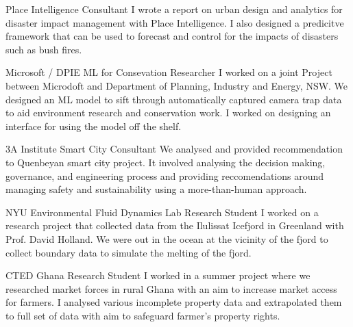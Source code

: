 {Place Intelligence}
{Consultant}
{
	I wrote a report on urban design and analytics for disaster impact management with Place Intelligence. I also designed a predicitve framework that can be used to forecast and control for the impacts of disasters such as bush fires.
}

{Microsoft / DPIE}
{ML for Consevation Researcher}
{
	I worked on a joint Project between Microdoft and Department of Planning, Industry and Energy, NSW. We designed an ML model to sift through automatically captured camera trap data to aid environment research and conservation work. I worked on designing an interface for using the model off the shelf.
}

{3A Institute}
{Smart City Consultant}
{
	We analysed and provided recommendation to Quenbeyan smart city project. It involved analysing the decision making, governance, and engineering process and providing reccomendations around managing safety and sustainability using a more-than-human approach.
}

{NYU Environmental Fluid Dynamics Lab}
{Research Student}
{
	I worked on a research project that collected data from the Ilulissat Icefjord in Greenland with Prof. David Holland. We were out in the ocean at the vicinity of the fjord to collect boundary data to simulate the melting of the fjord.
}

{CTED Ghana}
{Research Student}
{
	I worked in a summer project where we researched market forces in rural Ghana with an aim to increase market access for farmers. I analysed various incomplete property data and extrapolated them to full set of data with aim to safeguard farmer’s property rights.
}